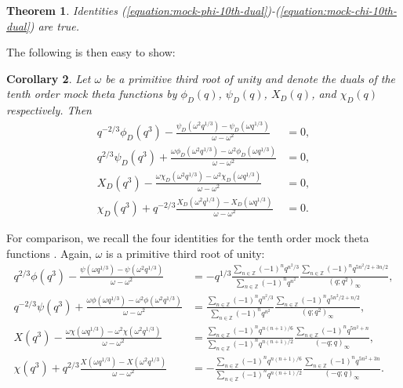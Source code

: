 \documentclass[12pt,reqno]{amsart}
\newtheorem{theorem}{Theorem}
\newtheorem{corollary}[theorem]{Corollary}
\theoremstyle{remark}
\theoremstyle{definition}
\numberwithin{theorem}{section} \numberwithin{equation}{section}
\numberwithin{example}{section}
\begin{document}
{\begin{theorem}\label{theorem:tenth-duals}  Identities (\ref{equation:mock-phi-10th-dual})-(\ref{equation:mock-chi-10th-dual}) are true.
\end{theorem}
\noindent The following is then easy to show:
\begin{corollary} Let $\omega$ be a primitive third root of unity and denote the duals of the tenth order mock theta functions by $\phi_D(q)$, $\psi_D(q)$, $X_D(q)$, and $\chi_D(q)$ respectively.  Then
\begin{align}
q^{-2/3}\phi_D(q^3)-\frac{\psi_D(\omega^2 q^{1/3})-\psi_D(\omega q^{1/3})}{\omega - \omega^2}&=0,\label{equation:tenth-dual-I}\\
q^{2/3}\psi_D(q^3)+\frac{\omega \phi_D(\omega^2 q^{1/3})-\omega^2\phi_D(\omega q^{1/3})}{\omega - \omega^2}&=0,\label{equation:tenth-dual-II}\\
X_D(q^3)-\frac{\omega \chi_D(\omega^2 q^{1/3})-\omega^2\chi_D(\omega q^{1/3})}{\omega - \omega^2}&=0,\label{equation:tenth-dual-III}\\
\chi_D(q^3)+q^{-2/3}\frac{ X_D(\omega^2 q^{1/3})-X_D(\omega q^{1/3})}{\omega - \omega^2}&=0.\label{equation:tenth-dual-IV}
\end{align}
\end{corollary}
\noindent For comparison, we recall the four identities for the tenth order mock theta functions \cite{CH1,CH2,Z10}.  Again, $\omega$ is a primitive third root of unity:
{\allowdisplaybreaks \begin{align*}
q^{2/3}\phi(q^3)-\frac{\psi(\omega q^{1/3})-\psi(\omega^2 q^{1/3})}{\omega - \omega^2}&=-q^{1/3}\frac{\sum_{n\in \mathbb{Z}} (-1)^nq^{n^2/3}}{\sum_{n\in \mathbb{Z}} (-1)^nq^{n^2}}\frac{\sum_{n\in \mathbb{Z}} (-1)^nq^{5n^2/2+3n/2}}{(q;q^2)_{\infty}},\\
q^{-2/3}\psi(q^3)+\frac{\omega \phi(\omega q^{1/3})-\omega^2\phi(\omega^2 q^{1/3})}{\omega - \omega^2}&=\frac{\sum_{n\in \mathbb{Z}} (-1)^nq^{n^2/3}}{\sum_{n\in \mathbb{Z}} (-1)^nq^{n^2}}\frac{\sum_{n\in \mathbb{Z}} (-1)^nq^{5n^2/2+n/2}}{(q;q^2)_{\infty}},\\
X(q^3)-\frac{\omega \chi(\omega q^{1/3})-\omega^2\chi(\omega^2 q^{1/3})}{\omega - \omega^2}&=\frac{\sum_{n\in \mathbb{Z}} (-1)^nq^{n(n+1)/6}}{\sum_{n\in \mathbb{Z}} (-1)^nq^{n(n+1)/2}}\frac{\sum_{n\in \mathbb{Z}} (-1)^nq^{5n^2+n}}{(-q;q)_{\infty}},\\
\chi(q^3)+q^{2/3}\frac{ X(\omega q^{1/3})-X(\omega^2 q^{1/3})}{\omega - \omega^2}&=-\frac{\sum_{n\in \mathbb{Z}} (-1)^nq^{n(n+1)/6}}{\sum_{n\in \mathbb{Z}} (-1)^nq^{n(n+1)/2}}\frac{\sum_{n\in \mathbb{Z}} (-1)^nq^{5n^2+3n}}{(-q;q)_{\infty}}.

\end{align*}}}
\end{document}
